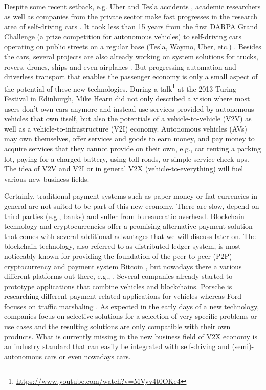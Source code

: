 \documentclass{llncs}
\begin{document}
{		Despite some recent setback, e.g. Uber and Tesla accidents \cite{bibid}\cite{bibid}\cite{bibid}, academic researchers as well as companies from the private sector make fast progresses in the research area of self-driving cars \cite{bibid}\cite{bibid}. It took less than 15 years from the first DARPA Grand Challenge (a prize competition for autonomous vehicles) to self-driving cars operating on public streets on a regular base (Tesla, Waymo, Uber, etc.) \cite{bibid}\cite{bibid}\cite{bibid}. Besides the cars, several projects are also already working on system solutions for trucks, rovers, drones, ships and even airplanes \cite{bibid}\cite{bibid}\cite{bibid}\cite{davWhitepaper}. But progressing automation and driverless transport that enables the passenger economy is only a small aspect of the potential of these new technologies. During a talk\footnote{\url{https://www.youtube.com/watch?v=MVyv4t0OKe4}} at the 2013 Turing Festival in Edinburgh, Mike Hearn did not only described a vision where most users don't own cars anymore and instead use services provided by autonomous vehicles that own itself, but also the potentials of a vehicle-to-vehicle (V2V) as well as a vehicle-to-infrastructure (V2I) economy. Autonomous vehicles (AVs) may own themselves, offer services and goods to earn money, and pay money to acquire services that they cannot provide on their own, e.g., car renting a parking lot, paying for a charged battery, using toll roads, or simple service check ups. The idea of V2V and V2I or in general V2X (vehicle-to-everything) will fuel various new business fields. 
		
		Certainly, traditional payment systems such as paper money or fiat currencies in general are not suited to be part of this new economy. There are slow, depend on third parties (e.g., banks) and suffer from bureaucratic overhead. Blockchain technology and cryptocurrencies offer a promising alternative payment solution that comes with several additional advantages that we will discuss later on. The blockchain technology, also referred to as distributed ledger system, is most noticeably known for providing the foundation of the peer-to-peer (P2P) cryptocurrency and payment system Bitcoin \cite{nakamoto_bitcoin:2008}, but nowadays there a various different platforms out there, e.g., \cite{tezosWhitepaper}\cite{iotaWhitepaper}\cite{wood2014ethereum}. Several companies already started to prototype applications that combine vehicles and blockchains. Porsche is researching different payment-related applications for vehicles \cite{porscheBlockchain} whereas Ford focuses on traffic marshaling \cite{macneille2018vehicle}. As expected in the early days of a new technology, companies focus on selective solutions for a selection of very specific problems or use cases and the resulting solutions are only compatible with their own products. What is currently missing in the new business field of V2X economy is an industry standard that can easily be integrated with self-driving and (semi)-autonomous cars or even nowadays cars. 

}
\end{document}
